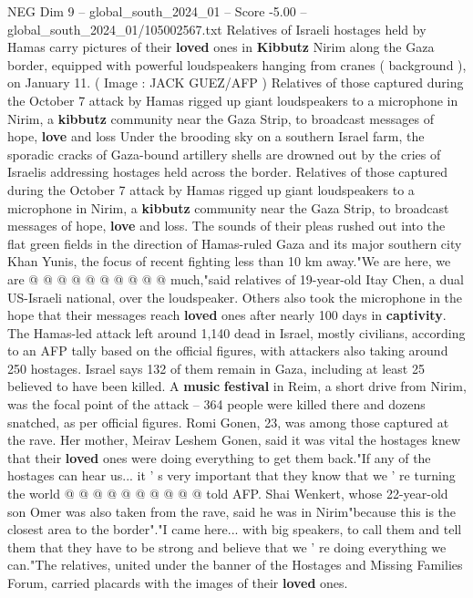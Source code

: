 \begin{textsample}{NEG Dim 9 – global\_south\_2024\_01 – Score -5.00 – global\_south\_2024\_01/105002567.txt}  \label{ex:f9_neg_425}
Relatives of Israeli hostages held by Hamas carry pictures of their \textbf{loved} ones in \textbf{Kibbutz} Nirim along the Gaza border, equipped with powerful loudspeakers hanging from cranes ( background ), on January 11. ( Image : JACK GUEZ/AFP ) Relatives of those captured during the October 7 attack by Hamas rigged up giant loudspeakers to a microphone in Nirim, a \textbf{kibbutz} community near the Gaza Strip, to broadcast messages of hope, \textbf{love} and loss Under the brooding sky on a southern Israel farm, the sporadic cracks of Gaza-bound artillery shells are drowned out by the cries of Israelis addressing hostages held across the border.
Relatives of those captured during the October 7 attack by Hamas rigged up giant loudspeakers to a microphone in Nirim, a \textbf{kibbutz} community near the Gaza Strip, to broadcast messages of hope, \textbf{love} and loss.
The sounds of their pleas rushed out into the flat green fields in the direction of Hamas-ruled Gaza and its major southern city Khan Yunis, the focus of recent fighting less than 10 km away."We are here, we are @ @ @ @ @ @ @ @ @ @ much,"said relatives of 19-year-old Itay Chen, a dual US-Israeli national, over the loudspeaker.
Others also took the microphone in the hope that their messages reach \textbf{loved} ones after nearly 100 days in \textbf{captivity}.
The Hamas-led attack left around 1,140 dead in Israel, mostly civilians, according to an AFP tally based on the official figures, with attackers also taking around 250 hostages.
Israel says 132 of them remain in Gaza, including at least 25 believed to have been killed.
A \textbf{music} \textbf{festival} in Reim, a short drive from Nirim, was the focal point of the attack -- 364 people were killed there and dozens snatched, as per official figures.
Romi Gonen, 23, was among those captured at the rave.
Her mother, Meirav Leshem Gonen, said it was vital the hostages knew that their \textbf{loved} ones were doing everything to get them back."If any of the hostages can hear us... it ' s very important that they know that we ' re turning the world @ @ @ @ @ @ @ @ @ @ told AFP.
Shai Wenkert, whose 22-year-old son Omer was also taken from the rave, said he was in Nirim"because this is the closest area to the border"."I came here... with big speakers, to call them and tell them that they have to be strong and believe that we ' re doing everything we can."The relatives, united under the banner of the Hostages and Missing Families Forum, carried placards with the images of their \textbf{loved} ones.

\end{textsample}
